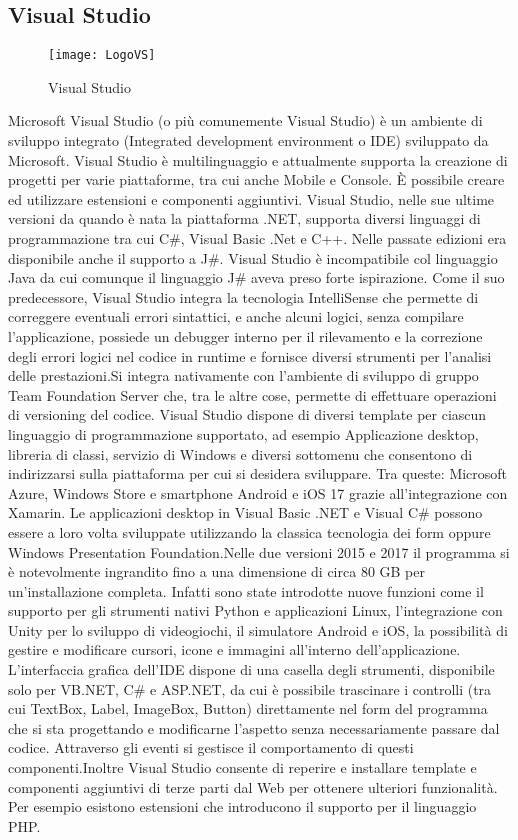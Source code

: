 \subsection{Visual Studio}
\begin{figure}[htpb!]
\center
  \texttt{[image: LogoVS]}
  \caption{Visual Studio}
\end{figure}
Microsoft Visual Studio\cite{vs} (o più comunemente Visual Studio) è un ambiente di sviluppo integrato (Integrated development environment o IDE) sviluppato da Microsoft.
Visual Studio è multilinguaggio e attualmente supporta la creazione di progetti per varie piattaforme, tra cui anche Mobile e Console. È possibile creare ed utilizzare estensioni e componenti aggiuntivi.
Visual Studio, nelle sue ultime versioni da quando è nata la piattaforma .NET, supporta diversi linguaggi di programmazione tra cui C\#, Visual Basic .Net e C++. Nelle passate edizioni era disponibile anche il supporto a J\#. Visual Studio è incompatibile col linguaggio Java da cui comunque il linguaggio J\# aveva preso forte ispirazione.
Come il suo predecessore, Visual Studio integra la tecnologia IntelliSense che permette di correggere eventuali errori sintattici, e anche alcuni logici, senza compilare l'applicazione, possiede un debugger interno per il rilevamento e la correzione degli errori logici nel codice in runtime e fornisce diversi strumenti per l'analisi delle prestazioni.Si integra nativamente con l'ambiente di sviluppo di gruppo Team Foundation Server che, tra le altre cose, permette di effettuare operazioni di versioning del codice.
Visual Studio dispone di diversi template per ciascun linguaggio di programmazione supportato, ad esempio Applicazione desktop, libreria di classi, servizio di Windows e diversi sottomenu che consentono di indirizzarsi sulla piattaforma per cui si desidera sviluppare. Tra queste: Microsoft Azure, Windows Store e smartphone Android e iOS
17
grazie all'integrazione con Xamarin. Le applicazioni desktop in Visual Basic .NET e Visual C\# possono essere a loro volta sviluppate utilizzando la classica tecnologia dei form oppure Windows Presentation Foundation.Nelle due versioni 2015 e 2017 il programma si è notevolmente ingrandito fino a una dimensione di circa 80 GB per un'installazione completa. Infatti sono state introdotte nuove funzioni come il supporto per gli strumenti nativi Python e applicazioni Linux, l'integrazione con Unity per lo sviluppo di videogiochi, il simulatore Android e iOS, la possibilità di gestire e modificare cursori, icone e immagini all'interno dell'applicazione.
L'interfaccia grafica dell'IDE dispone di una casella degli strumenti, disponibile solo per VB.NET, C\# e ASP.NET, da cui è possibile trascinare i controlli (tra cui TextBox, Label, ImageBox, Button) direttamente nel form del programma che si sta progettando e modificarne l'aspetto senza necessariamente passare dal codice. Attraverso gli eventi si gestisce il comportamento di questi componenti.Inoltre Visual Studio consente di reperire e installare template e componenti aggiuntivi di terze parti dal Web per ottenere ulteriori funzionalità. Per esempio esistono estensioni che introducono il supporto per il linguaggio PHP.
